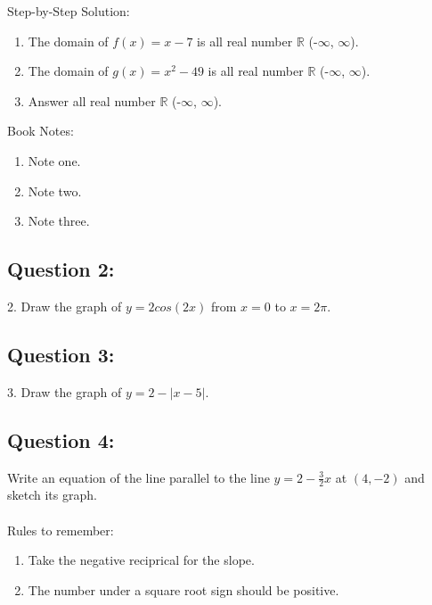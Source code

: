 \documentclass[12pt, letterpaper]{article}
\begin{document}
Step-by-Step Solution:
\begin{enumerate}
  \item The domain of $f(x)=x-7$ is all real number 
  $\mathbb{R}$ (-$\infty$, $\infty$). 
  \item The domain of $g(x)=x^2-49$ is all real number 
  $\mathbb{R}$ (-$\infty$, $\infty$).\\
  \item Answer all real number $\mathbb{R}$ (-$\infty$, $\infty$).
\end{enumerate}

Book Notes:
\begin{enumerate}
  \item Note one.
  \item Note two.
  \item Note three.
\end{enumerate}

\subsection{Question 2:}
2. Draw the graph of $y=2cos(2x)$ from $x=0$ to $x=2\pi$.

\subsection{Question 3:}
3. Draw the graph of $y=2-|x-5|$.


\subsection{Question 4:}
Write an equation of the line parallel to the line 
  $y=2-\frac{3}{2}x$ at $(4,-2)$ and sketch its graph.
  \\\\
  Rules to remember:
  \begin{enumerate}
    \item Take the negative reciprical for the slope.
    \item The number under a square root sign should be positive.
  \end{enumerate}
\end{document}
